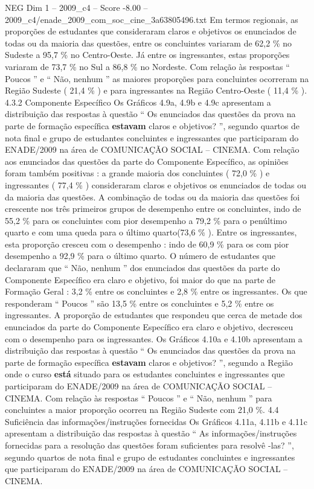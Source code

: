 \begin{textsample}{NEG Dim 1 – 2009\_c4 – Score -8.00 – 2009\_c4/enade\_2009\_com\_soc\_cine\_3a63805496.txt}
Em termos regionais, as proporções de estudantes que consideraram claros e objetivos os enunciados de todas ou da maioria das questões, entre os concluintes variaram de 62,2 \% no Sudeste a 95,7 \% no Centro-Oeste.
Já entre os ingressantes, estas proporções variaram de 73,7 \% no Sul a 86,8 \% no Nordeste.
Com relação às respostas “ Poucos ” e “ Não, nenhum ” as maiores proporções para concluintes ocorreram na Região Sudeste ( 21,4 \% ) e para ingressantes na Região Centro-Oeste ( 11,4 \% ). 4.3.2 Componente Específico Os Gráficos 4.9a, 4.9b e 4.9c apresentam a distribuição das respostas à questão “ Os enunciados das questões da prova na parte de formação específica \textbf{estavam} claros e objetivos? ”, segundo quartos de nota final e grupo de estudantes concluintes e ingressantes que participaram do ENADE/2009 na área de COMUNICAÇÃO SOCIAL – CINEMA.
Com relação aos enunciados das questões da parte do Componente Específico, as opiniões foram também positivas : a grande maioria dos concluintes ( 72,0 \% ) e ingressantes ( 77,4 \% ) consideraram claros e objetivos os enunciados de todas ou da maioria das questões.
A combinação de todas ou da maioria das questões foi crescente nos três primeiros grupos de desempenho entre os concluintes, indo de 55,2 \% para os concluintes com pior desempenho a 79,2 \% para o penúltimo quarto e com uma queda para o último quarto(73,6 \% ).
Entre os ingressantes, esta proporção cresceu com o desempenho : indo de 60,9 \% para os com pior desempenho a 92,9 \% para o último quarto.
O número de estudantes que declararam que “ Não, nenhum ” dos enunciados das questões da parte do Componente Específico era claro e objetivo, foi maior do que na parte de Formação Geral : 3,2 \% entre os concluintes e 2,8 \% entre os ingressantes.
Os que responderam “ Poucos ” são 13,5 \% entre os concluintes e 5,2 \% entre os ingressantes.
A proporção de estudantes que respondeu que cerca de metade dos enunciados da parte do Componente Específico era claro e objetivo, decresceu com o desempenho para os ingressantes.
Os Gráficos 4.10a e 4.10b apresentam a distribuição das respostas à questão “ Os enunciados das questões da prova na parte de formação específica \textbf{estavam} claros e objetivos? ”, segundo a Região onde o curso \textbf{está} situado para os estudantes concluintes e ingressantes que participaram do ENADE/2009 na área de COMUNICAÇÃO SOCIAL – CINEMA.
Com relação às respostas “ Poucos ” e “ Não, nenhum ” para concluintes a maior proporção ocorreu na Região Sudeste com 21,0 \%. 4.4 Suficiência das informações/instruções fornecidas Os Gráficos 4.11a, 4.11b e 4.11c apresentam a distribuição das respostas à questão “ As informações/instruções fornecidas para a resolução das questões foram suficientes para resolvê -las? ”, segundo quartos de nota final e grupo de estudantes concluintes e ingressantes que participaram do ENADE/2009 na área de COMUNICAÇÃO SOCIAL – CINEMA.

\end{textsample}
